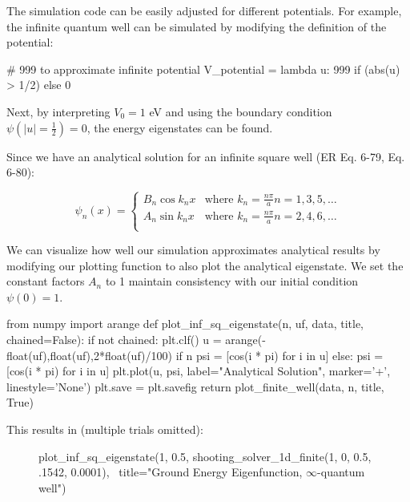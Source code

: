 \documentclass{article}
\begin{document}
The simulation code can be easily adjusted for different potentials. For
example, the infinite quantum well can be simulated by modifying the definition
of the potential:

\begin{sageblock}
# 999 to approximate infinite potential
V_potential = lambda u: 999 if (abs(u) > 1/2) else 0
\end{sageblock}

Next, by interpreting $V_0 = 1$ eV and using the boundary condition
$\psi(\text{\(\lvert u\rvert\)}=\frac{1}{2}) = 0$, the energy eigenstates can be found.

Since we have an analytical solution for an infinite square well (ER Eq. 6-79,
Eq. 6-80):

\begin{equation}
    \psi_n(x) = 
    \begin{cases}
        B_n \cos k_n x &\text{where } k_n = \frac{n\pi}{a} n = 1,3,5,\ldots\\
        A_n \sin k_n x &\text{where } k_n = \frac{n\pi}{a} n = 2,4,6,\ldots\\
    \end{cases}
\end{equation}

We can visualize how well our simulation approximates analytical results by modifying our
plotting function to also plot the analytical eigenstate. We set the constant factors $A_n$
to 1 maintain consistency with our initial condition $\psi(0) = 1$.

\begin{sageblock}
from numpy import arange
def plot_inf_sq_eigenstate(n, uf, data, title, chained=False):
    if not chained: plt.clf()
    u = arange(-float(uf),float(uf),2*float(uf)/100)
    if n %
        psi = [cos(i * pi) for i in u]
    else:
        psi = [cos(i * pi) for i in u]
    plt.plot(u, psi, label="Analytical Solution", marker='+', linestyle='None')
    plt.save = plt.savefig
    return plot_finite_well(data, n, title, True)
\end{sageblock}

This results in (multiple trials omitted):

\begin{figure}[H]
\begin{sageblock}
plot_inf_sq_eigenstate(1, 0.5, shooting_solver_1d_finite(1, 0, 0.5, .1542, 0.0001), \
                       title="Ground Energy Eigenfunction, $\infty$-quantum well")
\end{sageblock}
\vspace{-.1in}
\centering
{}
\end{figure}
\end{document}

